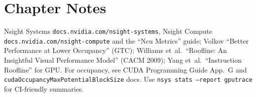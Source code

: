 \section{Chapter Notes}
Nsight Systems \texttt{docs.nvidia.com/nsight-systems}, Nsight Compute \texttt{docs.nvidia.com/nsight-compute} and the ``Ncu Metrics'' guide; Volkov ``Better Performance at Lower Occupancy'' (GTC); Williams et~al.\ ``Roofline: An Insightful Visual Performance Model'' (CACM 2009); Yang et~al.\ ``Instruction Roofline'' for GPU. For occupancy, see CUDA Programming Guide App.~G and \texttt{cudaOccupancyMaxPotentialBlockSize} docs. Use \texttt{nsys stats --report gputrace} for CI-friendly summaries.
